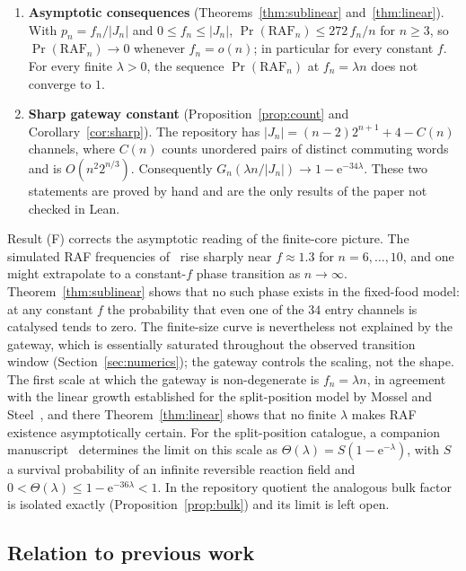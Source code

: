 \documentclass[11pt,a4paper]{article}
\theoremstyle{plain}
\theoremstyle{definition}
\theoremstyle{remark}
\newcommand{\RAF}{\mathrm{RAF}}
\renewcommand{\Pr}{\operatorname{Pr}}
\newcommand{\ee}{\mathrm{e}}
\begin{document}
\begin{enumerate}[label=\textbf{(\Alph*)},leftmargin=2.6em]
\[
0\le\Pr_p(\RAF_n)\le G_n(p):=1-(1-p)^{K_n}.
\]
\item \textbf{Asymptotic consequences} (Theorems~\ref{thm:sublinear} and~\ref{thm:linear}). With $p_n=f_n/|J_n|$ and $0\le f_n\le|J_n|$, $\Pr(\RAF_n)\le 272\,f_n/n$ for $n\ge3$, so $\Pr(\RAF_n)\to0$ whenever $f_n=o(n)$; in particular for every constant $f$. For every finite $\lambda>0$, the sequence $\Pr(\RAF_n)$ at $f_n=\lambda n$ does not converge to $1$.
\item \textbf{Sharp gateway constant} (Proposition~\ref{prop:count} and Corollary~\ref{cor:sharp}). The repository has $|J_n|=(n-2)2^{n+1}+4-C(n)$ channels, where $C(n)$ counts unordered pairs of distinct commuting words and is $O(n^2 2^{n/3})$. Consequently $G_n(\lambda n/|J_n|)\to1-\ee^{-34\lambda}$. These two statements are proved by hand and are the only results of the paper not checked in Lean.
\end{enumerate}

Result (F) corrects the asymptotic reading of the finite-core picture. The simulated RAF frequencies of~\cite{varanasi2026repository} rise sharply near $f\approx1.3$ for $n=6,\dots,10$, and one might extrapolate to a constant-$f$ phase transition as $n\to\infty$. Theorem~\ref{thm:sublinear} shows that no such phase exists in the fixed-food model: at any constant $f$ the probability that even one of the $34$ entry channels is catalysed tends to zero. The finite-size curve is nevertheless not explained by the gateway, which is essentially saturated throughout the observed transition window (Section~\ref{sec:numerics}); the gateway controls the scaling, not the shape. The first scale at which the gateway is non-degenerate is $f_n=\lambda n$, in agreement with the linear growth established for the split-position model by Mossel and Steel~\cite{mossel2005random}, and there Theorem~\ref{thm:linear} shows that no finite $\lambda$ makes RAF existence asymptotically certain. For the split-position catalogue, a companion manuscript~\cite{criticalwindow2026} determines the limit on this scale as $\Theta(\lambda)=S(1-\ee^{-\lambda})$, with $S$ a survival probability of an infinite reversible reaction field and $0<\Theta(\lambda)\le1-\ee^{-36\lambda}<1$. In the repository quotient the analogous bulk factor is isolated exactly (Proposition~\ref{prop:bulk}) and its limit is left open.

\subsection*{Relation to previous work}
\end{document}
